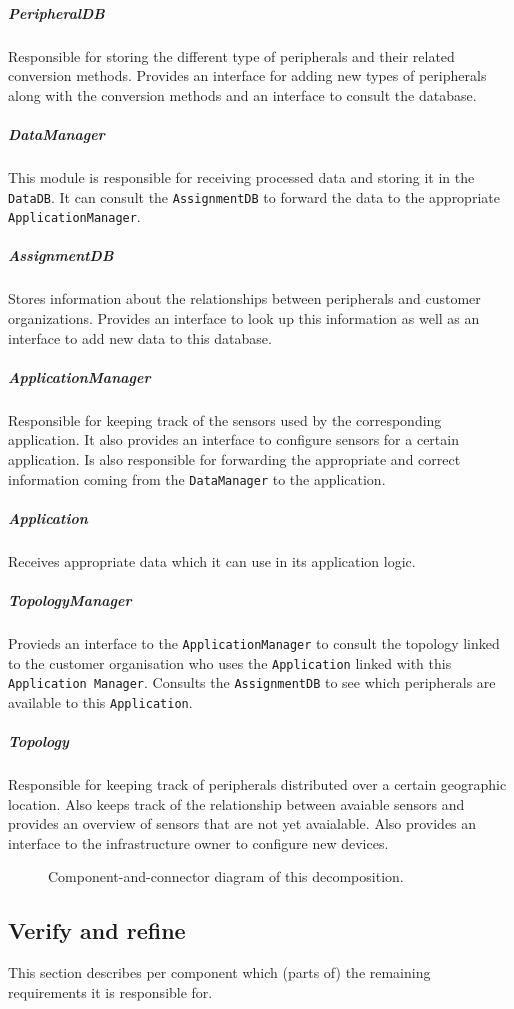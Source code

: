 \documentclass[english]{sareport}
\begin{document}
\subparagraph{PeripheralDB}
Responsible for storing the different type of peripherals and their related conversion methods. Provides an interface for adding new types of peripherals along with the conversion methods and an interface to consult the database.

\subparagraph{DataManager}
This module is responsible for receiving processed data and storing it in the \texttt{DataDB}. It can consult the \texttt{AssignmentDB} to forward the data to the appropriate \texttt{ApplicationManager}.

\subparagraph{AssignmentDB}
Stores information about the relationships between peripherals and customer organizations. Provides an interface to look up this information as well as an interface to add new data to this database.

\subparagraph{ApplicationManager}
Responsible for keeping track of the sensors used by the corresponding application. It also provides an interface to configure sensors for a certain application. Is also responsible for forwarding the appropriate and correct information coming from the \texttt{DataManager} to the application.

\subparagraph{Application}
Receives appropriate data which it can use in its application logic.

\subparagraph{TopologyManager}
Provieds an interface to the \texttt{ApplicationManager} to consult the topology linked to the customer organisation who uses the \texttt{Application} linked with this \texttt{Application Manager}. Consults the \texttt{AssignmentDB} to see which peripherals are available to this \texttt{Application}.

\subparagraph{Topology}
Responsible for keeping track of peripherals distributed over a certain geographic location. Also keeps track of the relationship between avaiable sensors and provides an overview of sensors that are not yet avaialable. Also provides an interface to the infrastructure owner to configure new devices.
\begin{figure}[!htp]
	\centering
	\caption{Component-and-connector diagram of this decomposition.
	}\label{fig:it1-cc_main}
\end{figure}

\subsection{Verify and refine}
This section describes per component which (parts of) the remaining
requirements it is responsible for.
\end{document}
